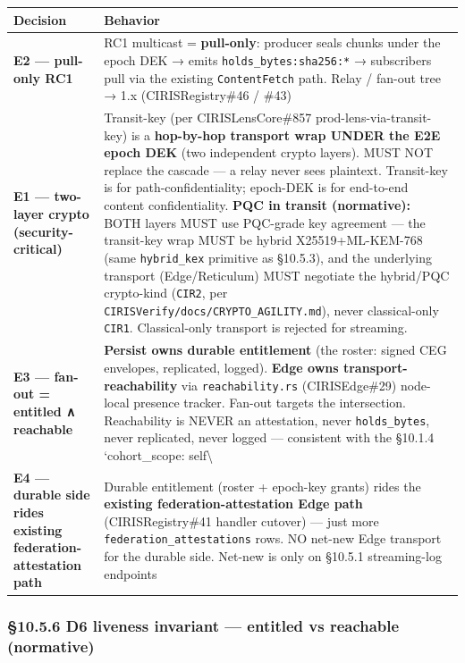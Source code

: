 \documentclass[11pt]{article}
\begin{document}
{\footnotesize
\begin{longtable}{|p{8.0cm}|p{8.0cm}|}\hline
\textbf{Decision} & \textbf{Behavior} \\ \hline\endhead
\textbf{E2 — pull-only RC1} & RC1 multicast = \textbf{pull-only}: producer seals chunks under the epoch DEK → emits \texttt{holds\_bytes:sha256:*} → subscribers pull via the existing \texttt{ContentFetch} path. Relay / fan-out tree → 1.x (CIRISRegistry\#46 / \#43) \\ \hline
\textbf{E1 — two-layer crypto (security-critical)} & Transit-key (per CIRISLensCore\#857 prod-lens-via-transit-key) is a \textbf{hop-by-hop transport wrap UNDER the E2E epoch DEK} (two independent crypto layers). MUST NOT replace the cascade — a relay never sees plaintext. Transit-key is for path-confidentiality; epoch-DEK is for end-to-end content confidentiality. \textbf{PQC in transit (normative):} BOTH layers MUST use PQC-grade key agreement — the transit-key wrap MUST be hybrid X25519+ML-KEM-768 (same \texttt{hybrid\_kex} primitive as §10.5.3), and the underlying transport (Edge/Reticulum) MUST negotiate the hybrid/PQC crypto-kind (\texttt{CIR2}, per \texttt{CIRISVerify/docs/CRYPTO\_AGILITY.md}), never classical-only \texttt{CIR1}. Classical-only transport is rejected for streaming. \\ \hline
\textbf{E3 — fan-out = entitled ∧ reachable} & \textbf{Persist owns durable entitlement} (the roster: signed CEG envelopes, replicated, logged). \textbf{Edge owns transport-reachability} via \texttt{reachability.rs} (CIRISEdge\#29) node-local presence tracker. Fan-out targets the intersection. Reachability is NEVER an attestation, never \texttt{holds\_bytes}, never replicated, never logged — consistent with the §10.1.4 `cohort\_scope: self\textbackslash{} \\ \hline
\textbf{E4 — durable side rides existing federation-attestation path} & Durable entitlement (roster + epoch-key grants) rides the \textbf{existing federation-attestation Edge path} (CIRISRegistry\#41 handler cutover) — just more \texttt{federation\_attestations} rows. NO net-new Edge transport for the durable side. Net-new is only on §10.5.1 streaming-log endpoints \\ \hline
\end{longtable}}


\subsubsection*{§10.5.6 D6 liveness invariant — entitled vs reachable (normative)}
\end{document}

